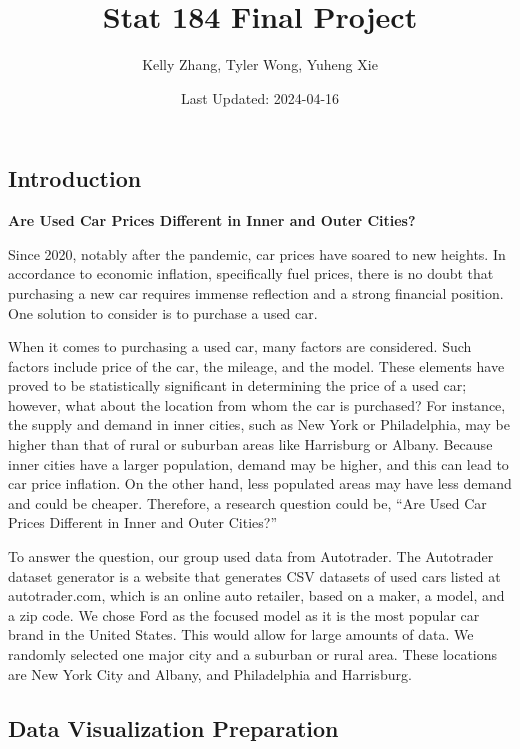 \documentclass[
]{article}
\title{Stat 184 Final Project}
\author{Kelly Zhang, Tyler Wong, Yuheng Xie}
\date{Last Updated: 2024-04-16}
\begin{document}
\maketitle

\hypertarget{introduction}{%
\subsection{Introduction}\label{introduction}}

\textbf{Are Used Car Prices Different in Inner and Outer Cities?}

Since 2020, notably after the pandemic, car prices have soared to new
heights. In accordance to economic inflation, specifically fuel prices,
there is no doubt that purchasing a new car requires immense reflection
and a strong financial position. One solution to consider is to purchase
a used car.

When it comes to purchasing a used car, many factors are considered.
Such factors include price of the car, the mileage, and the model. These
elements have proved to be statistically significant in determining the
price of a used car; however, what about the location from whom the car
is purchased? For instance, the supply and demand in inner cities, such
as New York or Philadelphia, may be higher than that of rural or
suburban areas like Harrisburg or Albany. Because inner cities have a
larger population, demand may be higher, and this can lead to car price
inflation. On the other hand, less populated areas may have less demand
and could be cheaper. Therefore, a research question could be, ``Are
Used Car Prices Different in Inner and Outer Cities?''

To answer the question, our group used data from Autotrader. The
Autotrader dataset generator is a website that generates CSV datasets of
used cars listed at autotrader.com, which is an online auto retailer,
based on a maker, a model, and a zip code. We chose Ford as the focused
model as it is the most popular car brand in the United States. This
would allow for large amounts of data. We randomly selected one major
city and a suburban or rural area. These locations are New York City and
Albany, and Philadelphia and Harrisburg.

\hypertarget{data-visualization-preparation}{%
\subsection{Data Visualization
Preparation}\label{data-visualization-preparation}}
\end{document}
